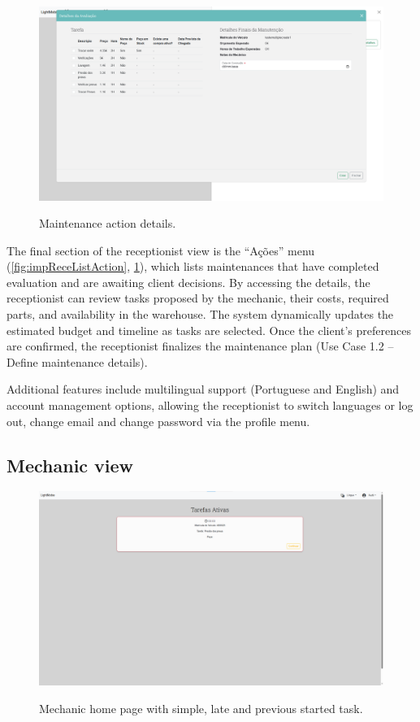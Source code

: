 \begin{figure}[h]
  \caption{Maintenance action details.}
  \centering
  \includegraphics[width=\textwidth]{figs/Implementation/rececionist/action_details}
  \label{fig:impReceActionHome}
\end{figure}

The final section of the receptionist view is the “Ações” menu (\ref{fig:impReceListAction}, \ref{fig:impReceActionHome}), which lists maintenances that have completed evaluation and are awaiting client decisions. By accessing the details, the receptionist can review tasks proposed by the mechanic, their costs, required parts, and availability in the warehouse. The system dynamically updates the estimated budget and timeline as tasks are selected. Once the client's preferences are confirmed, the receptionist finalizes the maintenance plan (Use Case 1.2 – Define maintenance details).



Additional features include multilingual support (Portuguese and English) and account management options, allowing the receptionist to switch languages or log out, change email and change password via the profile menu.


\subsection{Mechanic view}


\begin{figure}[h]
  \caption{Mechanic home page with simple, late and previous started task.}
  \centering
  \includegraphics[width=\textwidth]{figs/Implementation/mechanic/HomeContinueLate}
  \label{fig:HomeContinueLate}
\end{figure}





